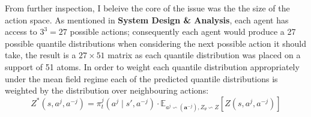 From further inspection, I beleive the core of the issue 
was the the size of the action space. As mentioned in \textbf{System Design \& Analysis},
each agent has access to $3^3 = 27$ possible actions; consequently
each agent would produce a 27 possible quantile distributions
when considering the next possible action it should take, the result is a $27 \times 51$ matrix
as each quantile distribution was placed on a support of 51 atoms.
In order to weight each quantile distribution appropriately
under the mean field regime each of the predicted quantile
distributions is weighted by the distribution over
neighbouring actions:
\begin{equation}
    Z^*(s,a^j, a^{-j}) = \pi^j_t(a^j \mid s',a^{-j}) \cdot \mathbb{E}_{a^j \backsim(\mathbf{a}^{-j}), Z_\theta \backsim Z}[\hat{Z}(s,a^j, a^{-j})]
\end{equation}

